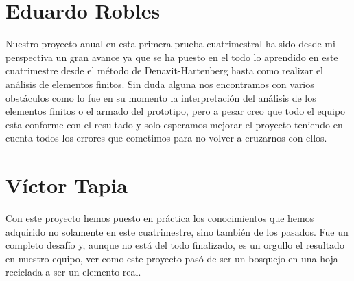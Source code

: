 \documentclass[11pt,a4paper,oldfontcommands,oneside]{memoir}
\begin{document}
\section{Eduardo Robles}
Nuestro proyecto anual en esta primera prueba cuatrimestral ha sido desde mi perspectiva un gran avance ya que se ha puesto en el todo lo aprendido en este cuatrimestre desde el método de Denavit-Hartenberg hasta como realizar el análisis de elementos finitos.  Sin duda alguna nos encontramos con varios obstáculos como lo fue en su momento la interpretación del análisis de los elementos finitos o el armado del prototipo, pero a pesar creo que todo el equipo esta conforme con el resultado y solo esperamos mejorar el proyecto teniendo en cuenta todos los errores que cometimos para no volver a cruzarnos con ellos.
\section{Víctor Tapia}
Con este proyecto hemos puesto en práctica los conocimientos que hemos adquirido no solamente en este cuatrimestre, sino también de los pasados. Fue un completo desafío y, aunque no está del todo finalizado, es un orgullo el resultado en nuestro equipo, ver como este proyecto pasó de ser un bosquejo en una hoja reciclada a ser un elemento real.

\cite{Morales:2009}
\cite{de2006robotica}

\end{document}
